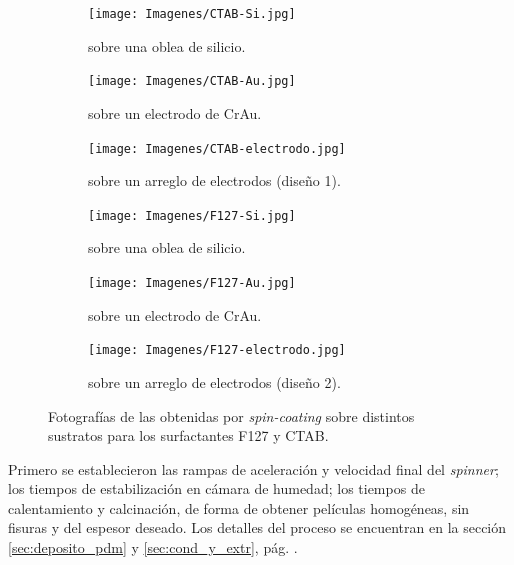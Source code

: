 			\begin{figure}[h!]
	 	   	    \begin{subfigure}[t]{0.325\textwidth}
		        	\texttt{[image: Imagenes/CTAB-Si.jpg]}
		       		\caption{\pdmC\space sobre una oblea de silicio.}
		         	\label{fig:F127_vidrio}
		     		\end{subfigure}
	     		\begin{subfigure}[t]{0.325\textwidth}
		        	\texttt{[image: Imagenes/CTAB-Au.jpg]}
		       		\caption{\pdmC\space sobre un electrodo de Cr\textbar Au.}
		         	\label{fig:F127_silicio}
		     		\end{subfigure}
	     		\begin{subfigure}[t]{0.325\textwidth}
		        	\texttt{[image: Imagenes/CTAB-electrodo.jpg]}
		       		\caption{\pdmC\space sobre un arreglo de electrodos (diseño 1).}
		         	\label{fig:F127_Au}
		     		\end{subfigure}
	 	   	    \begin{subfigure}[t]{0.325\textwidth}
		        	\texttt{[image: Imagenes/F127-Si.jpg]}
		       		\caption{\pdmF\space sobre una oblea de silicio.}
		         	\label{fig:CTAB_vidrio}
		     		\end{subfigure}
	     		\begin{subfigure}[t]{0.325\textwidth}
		        	\texttt{[image: Imagenes/F127-Au.jpg]}
		       		\caption{\pdmF\space sobre un electrodo de Cr\textbar Au.}
		         	\label{fig:CTAB_silicio}
		     		\end{subfigure}
	     		\begin{subfigure}[t]{0.325\textwidth}
		        	\texttt{[image: Imagenes/F127-electrodo.jpg]}
		       		\caption{\pdmF\space sobre un arreglo de electrodos (diseño 2).}
		         	\label{fig:CTAB_Au}
		     		\end{subfigure}
	     		\caption[Películas mesoporosas sobre distintos soportes.]{Fotografías de las \pdm\space obtenidas por \textit{spin-coating }sobre distintos sustratos para los surfactantes F127 y CTAB.}
	     		\label{fig:fotos_films}
	     	   	\end{figure}

		 Primero se establecieron las rampas de aceleración y velocidad final del \textit{spinner}; los tiempos de estabilización en cámara de humedad; los tiempos de calentamiento y calcinación, de forma de obtener películas homogéneas, sin fisuras y del espesor deseado. Los detalles del proceso se encuentran en la sección \ref{sec:deposito_pdm} y \ref{sec:cond_y_extr}, pág. \pageref{sec:deposito_pdm}. 

